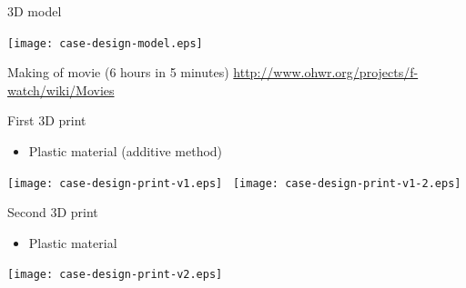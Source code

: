 \documentclass[compress,red]{beamer}
\begin{document}

\begin{frame}{3D model}

  \begin{center}
    \texttt{[image: case-design-model.eps]}
  \end{center}

  Making of movie (6 hours in 5 minutes)
  \url{http://www.ohwr.org/projects/f-watch/wiki/Movies}

  \note[item]{}

\end{frame}

\begin{frame}{First 3D print}

  \begin{itemize}
  \item Plastic material (additive method)
  \end{itemize}

  \begin{center}
    \texttt{[image: case-design-print-v1.eps]}~
    \texttt{[image: case-design-print-v1-2.eps]}
  \end{center}


\end{frame}

\begin{frame}{Second 3D print}

  \begin{itemize}
  \item Plastic material
  \end{itemize}

  \begin{center}
    \texttt{[image: case-design-print-v2.eps]}
  \end{center}


\end{frame}
\end{document}
